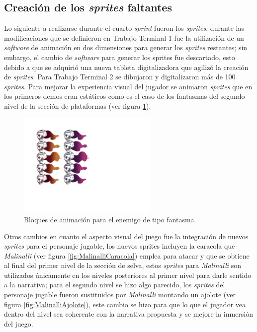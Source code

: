 \subsection{Creación de los \textit{sprites} faltantes}
Lo siguiente a realizarse durante el cuarto \textit{sprint} fueron los \textit{sprites}, 
durante las modificaciones que se definieron en Trabajo Terminal 1 fue la 
utilización de un \textit{software} de animación en dos dimensiones para generar 
los \textit{sprites} restantes; sin embargo, el cambio de \textit{software} para 
generar los sprites fue descartado, esto debido a que se adquirió una nueva 
tableta digitalizadora que agilizó la creación de \textit{sprites}. Para Trabajo 
Terminal 2 se dibujaron y digitalizaron más de 100 \textit{sprites}. Para mejorar 
la experiencia visual del jugador se animaron \textit{sprites} que en los primeros 
demos eran estáticos como es el caso de los fantasmas del segundo nivel de la 
sección de plataformas (ver figura \ref{fig:FantasmaAnimacion}). 

\begin{figure}[h]
	\centering
	\includegraphics[width=0.6\textwidth]{03TrabajoRealizado/imagenes/fantasmas.png}
 	\caption{Bloques de animación para el enemigo de tipo fantasma.}
	\label{fig:FantasmaAnimacion}		
\end{figure}

Otros cambios en cuanto el aspecto visual del juego fue la integración de nuevos 
\textit{sprites} para el personaje jugable, los nuevos sprites incluyen la 
caracola que \textit{Malinalli} (ver figura \ref{fig:MalinalliCaracola}) emplea 
para atacar y que se obtiene al final del primer nivel de la sección de selva, 
estos \textit{sprites} para \textit{Malinalli} son utilizados únicamente en los 
niveles posteriores al primer nivel para darle sentido a la narrativa; para el 
segundo nivel se hizo algo parecido, los \textit{sprites} del personaje jugable 
fueron sustituidos por \textit{Malinalli} montando un ajolote (ver figura 
\ref{fig:MalinalliAjolote}), este cambio se hizo para que lo que el jugador vea 
dentro del nivel sea coherente con la narrativa propuesta y se mejore la inmersión del juego. 

